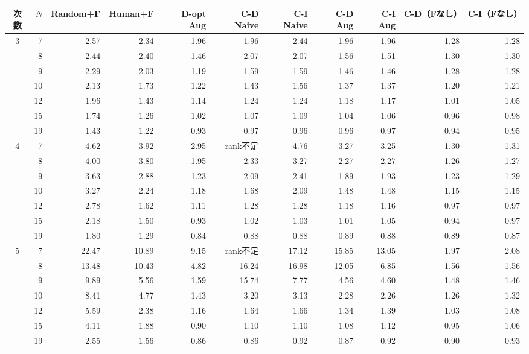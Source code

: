 \begin{tabular}{crrrrrrrrrr}
\toprule
次数 & $N$ & Random+F & Human+F & D-opt Aug & C-D Naive & C-I Naive & C-D Aug & C-I Aug & C-D（Fなし） & C-I（Fなし） \\
\midrule
\multirow{7}{*}{3} & 7 & 2.57 & 2.34 & 1.96 & 1.96 & 2.44 & 1.96 & 1.96 & 1.28 & 1.28 \\
 & 8 & 2.44 & 2.40 & 1.46 & 2.07 & 2.07 & 1.56 & 1.51 & 1.30 & 1.30 \\
 & 9 & 2.29 & 2.03 & 1.19 & 1.59 & 1.59 & 1.46 & 1.46 & 1.28 & 1.28 \\
 & 10 & 2.13 & 1.73 & 1.22 & 1.43 & 1.56 & 1.37 & 1.37 & 1.20 & 1.21 \\
 & 12 & 1.96 & 1.43 & 1.14 & 1.24 & 1.24 & 1.18 & 1.17 & 1.01 & 1.05 \\
 & 15 & 1.74 & 1.26 & 1.02 & 1.07 & 1.09 & 1.04 & 1.06 & 0.96 & 0.98 \\
 & 19 & 1.43 & 1.22 & 0.93 & 0.97 & 0.96 & 0.96 & 0.97 & 0.94 & 0.95 \\
\midrule
\multirow{7}{*}{4} & 7 & 4.62 & 3.92 & 2.95 & rank不足 & 4.76 & 3.27 & 3.25 & 1.30 & 1.31 \\
 & 8 & 4.00 & 3.80 & 1.95 & 2.33 & 3.27 & 2.27 & 2.27 & 1.26 & 1.27 \\
 & 9 & 3.63 & 2.88 & 1.23 & 2.09 & 2.41 & 1.89 & 1.93 & 1.23 & 1.29 \\
 & 10 & 3.27 & 2.24 & 1.18 & 1.68 & 2.09 & 1.48 & 1.48 & 1.15 & 1.15 \\
 & 12 & 2.78 & 1.62 & 1.11 & 1.28 & 1.28 & 1.18 & 1.16 & 0.97 & 0.97 \\
 & 15 & 2.18 & 1.50 & 0.93 & 1.02 & 1.03 & 1.01 & 1.05 & 0.94 & 0.97 \\
 & 19 & 1.80 & 1.29 & 0.84 & 0.88 & 0.88 & 0.89 & 0.88 & 0.89 & 0.87 \\
\midrule
\multirow{7}{*}{5} & 7 & 22.47 & 10.89 & 9.15 & rank不足 & 17.12 & 15.85 & 13.05 & 1.97 & 2.08 \\
 & 8 & 13.48 & 10.43 & 4.82 & 16.24 & 16.98 & 12.05 & 6.85 & 1.56 & 1.56 \\
 & 9 & 9.89 & 5.56 & 1.59 & 15.74 & 7.77 & 4.56 & 4.60 & 1.48 & 1.46 \\
 & 10 & 8.41 & 4.77 & 1.43 & 3.20 & 3.13 & 2.28 & 2.26 & 1.26 & 1.32 \\
 & 12 & 5.59 & 2.38 & 1.16 & 1.64 & 1.66 & 1.34 & 1.39 & 1.03 & 1.08 \\
 & 15 & 4.11 & 1.88 & 0.90 & 1.10 & 1.10 & 1.08 & 1.12 & 0.95 & 1.06 \\
 & 19 & 2.55 & 1.56 & 0.86 & 0.86 & 0.92 & 0.87 & 0.92 & 0.90 & 0.93 \\
\bottomrule
\end{tabular}

